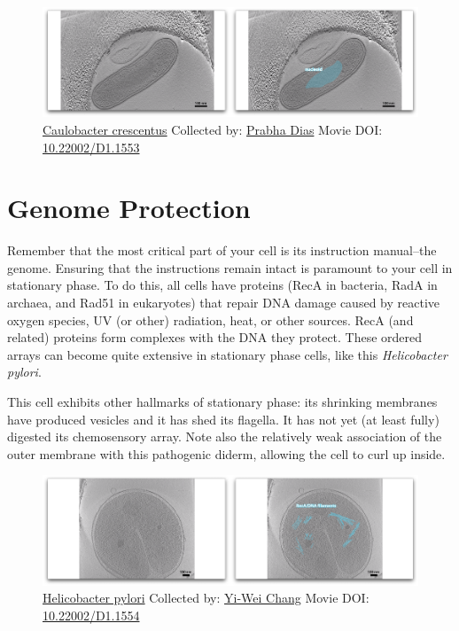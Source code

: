 \documentclass[]{tufte-book}
\begin{document}
\begin{figure}
\includegraphics{movie_stills/8_1} \caption[\protect\hyperlink{tree}{Caulobacter crescentus} Collected by:
\protect\hyperlink{prabha_dias}{Prabha Dias} Movie DOI:
\href{https://doi.org/10.22002/D1.1553}{10.22002/D1.1553}]{\protect\hyperlink{tree}{Caulobacter crescentus} Collected by:
\protect\hyperlink{prabha_dias}{Prabha Dias} Movie DOI:
\href{https://doi.org/10.22002/D1.1553}{10.22002/D1.1553}}\label{fig:8-1}
\end{figure}

\section{Genome Protection}\label{genome-protection}

Remember that the most critical part of your cell is its instruction
manual--the genome. Ensuring that the instructions remain intact is
paramount to your cell in stationary phase. To do this, all cells have
proteins (RecA in bacteria, RadA in archaea, and Rad51 in eukaryotes)
that repair DNA damage caused by reactive oxygen species, UV (or other)
radiation, heat, or other sources. RecA (and related) proteins form
complexes with the DNA they protect. These ordered arrays can become
quite extensive in stationary phase cells, like this \emph{Helicobacter
pylori}.

This cell exhibits other hallmarks of stationary phase: its shrinking
membranes have produced vesicles and it has shed its flagella. It has
not yet (at least fully) digested its chemosensory array. Note also the
relatively weak association of the outer membrane with this pathogenic
diderm, allowing the cell to curl up inside.





\begin{figure}
\includegraphics{movie_stills/8_2} \caption[\protect\hyperlink{tree}{Helicobacter pylori} Collected by:
\protect\hyperlink{yi-wei_chang}{Yi-Wei Chang} Movie DOI:
\href{https://doi.org/10.22002/D1.1554}{10.22002/D1.1554}]{\protect\hyperlink{tree}{Helicobacter pylori} Collected by:
\protect\hyperlink{yi-wei_chang}{Yi-Wei Chang} Movie DOI:
\href{https://doi.org/10.22002/D1.1554}{10.22002/D1.1554}}\label{fig:8-2}
\end{figure}
\end{document}
